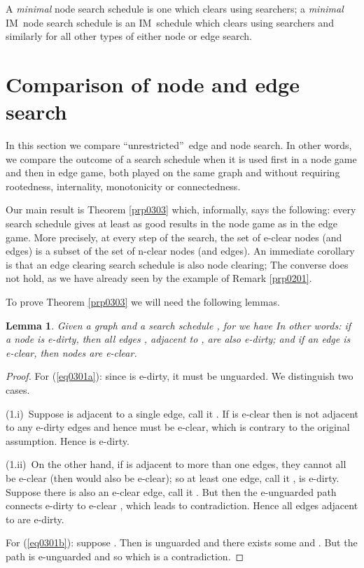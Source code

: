 \documentclass[11pt]{article}\usepackage{amsmath}
\newtheorem{lemma}[theorem]{Lemma}
{\theoremstyle{definition}
\newtheorem{notation}[theorem]{Notation}
}
\begin{document}
A \emph{minimal} node search schedule is one which clears  using
 searchers; a \emph{minimal} IM\ node search
schedule is an IM\ schedule which clears  using  searchers and similarly for all other types of either
node or edge search.

\section{Comparison of node and edge search}

\label{sec03}

In this section we compare \textquotedblleft unrestricted\textquotedblright \ edge and node search. In other words, we compare the outcome of a search
schedule  when it is used first in a node game and then in edge
game, both played on the same graph  and without requiring
rootedness, internality, monotonicity or connectedness.

Our main result is Theorem \ref{prp0303} which, informally, says the
following: every search schedule  gives at least as good results
in the node game as in the edge game. More precisely, at every step  of the
search, the set of e-clear nodes (and edges) is a subset of the set of n-clear
nodes (and edges). An immediate corollary is that an edge clearing search
schedule is also node clearing; The converse does not hold, as we have already
seen by the example of Remark \ref{prp0201}.

To prove Theorem \ref{prp0303} we will need the following lemmas.

\begin{lemma}
\label{prp0301}Given a graph  and a search schedule ,
for  we have
In other words: if a node  is e-dirty, then all edges , adjacent to
, are also e-dirty; and if an edge  is e-clear, then nodes  are e-clear.
\end{lemma}

\begin{proof}
For (\ref{eq0301a}): since  is e-dirty, it must be unguarded. We
distinguish two cases.

\noindent(1.i)\ Suppose  is adjacent to a single edge, call it . If
 is e-clear then  is not adjacent to any e-dirty edges and hence must
be e-clear, which is contrary to the original assumption. Hence  is e-dirty.

\noindent(1.ii)\ On the other hand, if  is adjacent to more than one edges,
they cannot all be e-clear (then  would also be e-clear); so at least one
edge, call it , is e-dirty. Suppose there is also an e-clear edge, call it
. But then the e-unguarded path  connects e-dirty  to e-clear
, which leads to contradiction. Hence all edges adjacent to  are e-dirty.

For (\ref{eq0301b}): suppose . Then  is
unguarded and there exists some  and . But the path  is e-unguarded and so  which is a contradiction.
\end{proof}
\end{document}
